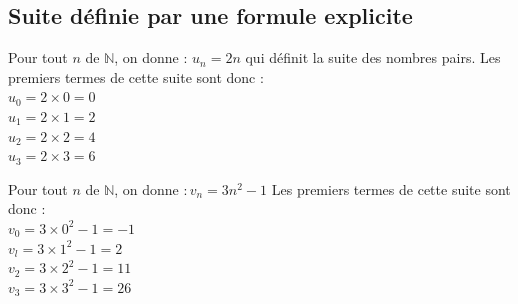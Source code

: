 \subsection{Suite définie par une formule explicite}

\begin{bexemples}
	\begin{itemEx}
		\item Pour tout $n$ de $\mathbb{N}$, on donne : $u_{n}=2 n$ qui définit la suite des nombres pairs. Les premiers termes de cette suite sont donc :\\
		$u_{0}=2 \times 0=0$\\
		$u_{1}=2 \times 1=2$\\
		$u_{2}=2 \times 2=4$\\
		$u_{3}=2 \times 3=6$
		\item Pour tout $n$ de $\mathbb{N}$, on donne $: v_{n}=3 n^{2}-1$ Les premiers termes de cette suite sont donc :\\
		$v_{0}=3 \times 0^{2}-1=-1$\\
		$v_{l}=3 \times 1^{2}-1=2$\\
		$v_{2}=3 \times 2^{2}-1=11$\\
		$v_{3}=3 \times 3^{2}-1=26$
	\end{itemEx}
\end{bexemples}
\begin{bdefi}
	\pointille[\textwidth-1cm]\\
	\pointille[\textwidth-1cm]\\
	\pointille[\textwidth-1cm]
\end{bdefi}

